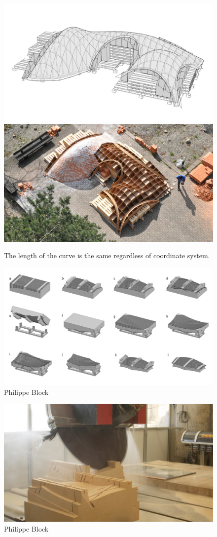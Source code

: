 \begin{figure}[H]
\centering
\includegraphics[width=0.45\linewidth ]{figure/Introduction/VaultBlock2.jpg}
\includegraphics[width=0.45\linewidth ]{figure/Introduction/VaultBlock.jpg}

\caption{The length of the curve is the same regardless of coordinate system.}
\end{figure}






\begin{figure}[H]
\centering
\includegraphics[width=0.9\linewidth ]{figure/Introduction/digitalstereotomyBlock.jpg}
\caption{Philippe Block}
\end{figure}

\begin{figure}[H]
\centering
\includegraphics[width=0.8\linewidth ]{figure/Introduction/digitalstereotomyBlock2.jpg}
\caption{Philippe Block}
\end{figure}


